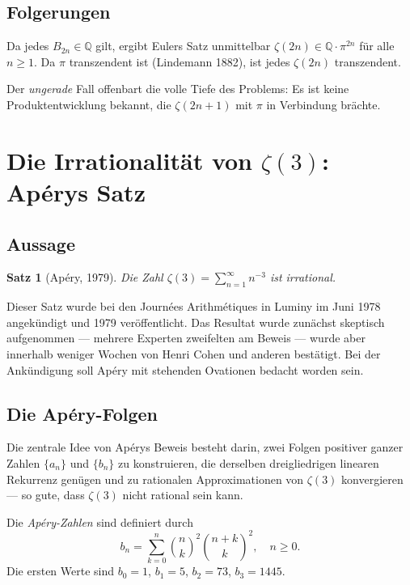\documentclass[12pt,a4paper]{amsart}
\newtheorem{theorem}{Satz}[section]
\theoremstyle{definition}
\theoremstyle{remark}
\begin{document}
\subsection{Folgerungen}

Da jedes $B_{2n} \in \mathbb{Q}$ gilt, ergibt Eulers Satz unmittelbar
$\zeta(2n) \in \mathbb{Q} \cdot \pi^{2n}$ für alle $n \geq 1$. Da $\pi$
transzendent ist (Lindemann 1882), ist jedes $\zeta(2n)$ transzendent.

Der \emph{ungerade} Fall offenbart die volle Tiefe des Problems: Es ist keine
Produktentwicklung bekannt, die $\zeta(2n+1)$ mit $\pi$ in Verbindung brächte.

\section{Die Irrationalität von $\zeta(3)$: Apérys Satz}

\subsection{Aussage}

\begin{theorem}[Apéry, 1979]\label{thm:apery}
  Die Zahl $\zeta(3) = \sum_{n=1}^{\infty} n^{-3}$ ist irrational.
\end{theorem}

Dieser Satz wurde bei den Journées Arithmétiques in Luminy im Juni 1978 angekündigt
und 1979 veröffentlicht. Das Resultat wurde zunächst skeptisch aufgenommen ---
mehrere Experten zweifelten am Beweis --- wurde aber innerhalb weniger Wochen von
Henri Cohen und anderen bestätigt. Bei der Ankündigung soll Apéry mit stehenden
Ovationen bedacht worden sein.

\subsection{Die Apéry-Folgen}

Die zentrale Idee von Apérys Beweis besteht darin, zwei Folgen positiver ganzer
Zahlen $\{a_n\}$ und $\{b_n\}$ zu konstruieren, die derselben dreigliedrigen
linearen Rekurrenz genügen und zu rationalen Approximationen von $\zeta(3)$
konvergieren --- so gute, dass $\zeta(3)$ nicht rational sein kann.

Die \emph{Apéry-Zahlen} sind definiert durch
\[
  b_n = \sum_{k=0}^{n} \binom{n}{k}^2 \binom{n+k}{k}^2, \quad n \geq 0.
\]
Die ersten Werte sind $b_0 = 1$, $b_1 = 5$, $b_2 = 73$, $b_3 = 1445$.
\end{document}
